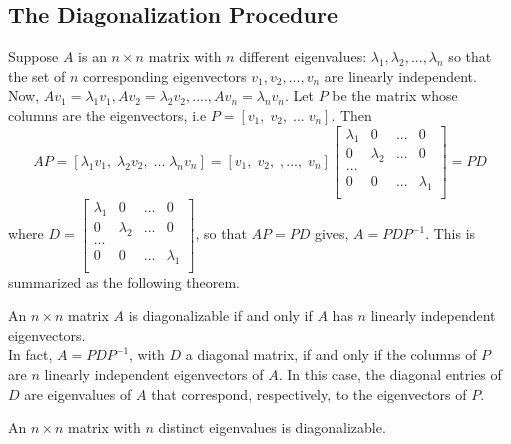 \documentclass[aima104_lecturenotes_ku.tex]{subfiles}
\begin{document}
\subsection{The Diagonalization Procedure}
Suppose $A$ is an $n \times n$ matrix with $n$ different eigenvalues: $\lambda_1, \lambda_2, ..., \lambda_n$ so that the set of $n$ corresponding eigenvectors $v_1, v_2, ..., v_n$ are linearly independent. Now, $Av_1=\lambda _1 v_1, Av_2=\lambda _2 v_2, ...., Av_n = \lambda _n v_n$. Let $P$ be the matrix whose columns are the eigenvectors, i.e $P = [v_1, \; v_2, \; ... \; v_n] $. Then
\begin{equation}
  \label{eq:1}
AP = [\lambda _1 v_1, \; \lambda_2 v_2, \; ... \; \lambda_n v_n] =
 [v_1, \; v_2, \; , ..., \; v_n] \begin{bmatrix}
  \lambda_1 & 0 & ... & 0 \\
  0 & \lambda_2 & ... & 0 \\
  ... \\
  0 & 0 & ... & \lambda_1 \\
\end{bmatrix} = PD
\end{equation}
where $ D = \begin{bmatrix}
  \lambda_1 & 0 & ... & 0 \\
  0 & \lambda_2 & ... & 0 \\
  ... \\
  0 & 0 & ... & \lambda_1 \\
\end{bmatrix} $, so that $AP = PD$ gives, $A = P D P^{-1}$. This is summarized as the following theorem.

\setcounter{thm}{2}
\begin{thm}
  An $n \times n$ matrix $A$ is diagonalizable if and only if $A$ has $n$ linearly independent eigenvectors. \\
  In fact, $A = PDP^{-1}$, with $D$ a diagonal matrix, if and only if the columns of $P$ are $n$ linearly independent eigenvectors of $A$. In this case, the diagonal entries of $D$ are eigenvalues of $A$ that correspond, respectively, to the eigenvectors of $P$.
\end{thm}

\setcounter{theorem}{3}
\begin{theorem}
  An $n \times n$ matrix with $n$ distinct eigenvalues is diagonalizable.
\end{theorem}
\end{document}
